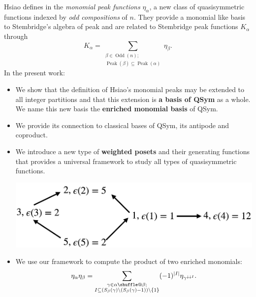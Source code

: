 \documentclass[numbers=enddot,12pt,final,onecolumn,notitlepage]{scrartcl}%
\makeatletter
\newcommand{\al}{\alpha}
\newcommand{\be}{\beta}
\newcommand{\Odd}{\operatorname{Odd}}
\newcommand{\Peak}{\operatorname{Peak}}
\providecommand*{\shuffle}{%
  \mathbin{\mathpalette\shuffle@{}}%
}
\newcommand*{\shuffle@}[2]{%
  \sbox0{$#1\vcenter{}$}%
  \kern .15\ht0 %
  \rlap{\vrule height .25\ht0 depth 0pt width 2.5\ht0}%
  \raise.1\ht0\hbox to 2.5\ht0{%
    \vrule height 1.75\ht0 depth -.1\ht0 width .17\ht0 %
    \hfill
    \vrule height 1.75\ht0 depth -.1\ht0 width .17\ht0 %
    \hfill
    \vrule height 1.75\ht0 depth -.1\ht0 width .17\ht0 %
  }%
  \kern .15\ht0 %
}
\newcommand{\0}{\phantom{c}}
\let\sumnonlimits\sum
\renewcommand{\sum}{\sumnonlimits\limits}
\makeatother
\begin{document}
\begin{tcolorbox}[colback=cyan!5,colframe=cyan!75!black,title=Summary] Hsiao defines in \cite{Hsi07} the \emph{monomial peak functions} $\eta_{\al}$, a new class of quasisymmetric functions indexed by \emph{odd compositions} of $n$. They provide a monomial like basis to Stembridge's algebra of peak \cite{Ste97} and are related to Stembridge peak functions $K_\al$ through
\begin{equation*}
K_{\al} = \sum_{{\substack{\beta \in \Odd(n);\\ \Peak(\beta) \subseteq \Peak(\al)}}} \eta_{\beta}.
\end{equation*}
\tcblower
In the present work: 
\begin{itemize}
\item We show that the definition of Hsiao's monomial peaks may be extended to all integer partitions and that this extension is \textbf{a basis of QSym} as a whole. We name this new basis the \textbf{enriched monomial basis} of QSym.
\item We provide its connection to classical bases of QSym, its antipode and coproduct. 
\item We introduce a new type of \textbf{weighted posets} and their generating functions that provides a universal framework to study all types of quasisymmetric functions.

\begin{center}
\includegraphics[scale=0.16]{Poset.png}
\end{center}
 
\item We use our framework to compute the product of two enriched monomials:
\begin{equation*}
\eta_\al \eta_\beta
= \sum_{\substack{\gamma \in \al \shuffle \be ;\\
                   I\subseteq \left(S_{\be}(\gamma)\setminus (S_{\be}(\gamma)-1)\right) \setminus \left\{1\right\}}}
(-1)^{|I|}\eta_{\gamma^{\downarrow\downarrow I}} .
\end{equation*}
\end{itemize}
\end{tcolorbox}
\end{document}
